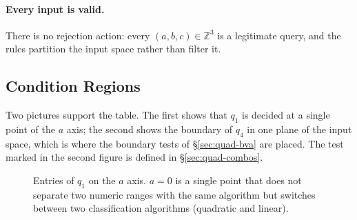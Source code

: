 \documentclass[11pt,a4paper]{article}
\begin{document}
\paragraph{Every input is valid.} There is no rejection action: every
\((a,b,c)\in\mathbb{Z}^3\) is a legitimate query, and the rules partition the
input space rather than filter it.
\subsection{Condition Regions}
\label{sec:quad-regions}

Two pictures support the table. The first shows that \(q_1\) is decided at
a single point of the \(a\) axis; the second shows the boundary of \(q_4\) in
one plane of the input space, which is where the boundary tests of
\S\ref{sec:quad-bva} are placed. The test marked in the second figure is
defined in \S\ref{sec:quad-combos}.

\begin{figure}[H]
\centering
{}
\caption{Entries of \(q_1\) on the \(a\) axis. \(a=0\) is a single point
that does not separate two numeric ranges with the same algorithm but
switches between two classification algorithms (quadratic and linear).}
\label{fig:quad-a-line}
\end{figure}
\end{document}
